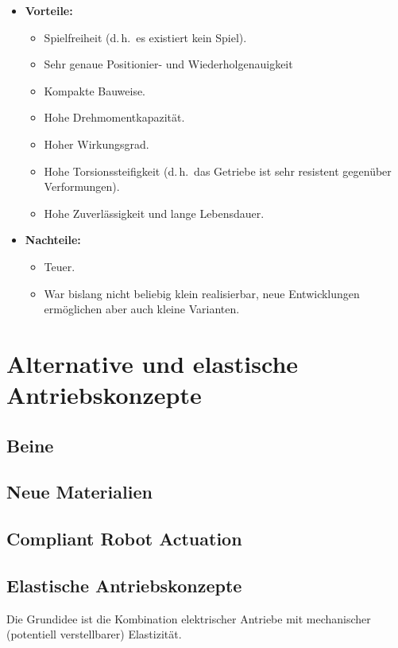 \documentclass[a4paper, 11pt, accentcolor = tud3b]{tudreport}
\renewcommand{\dh}{d.\,h.~}
\begin{document}
					\begin{itemize}
						\item \textbf{Vorteile:}
							\begin{itemize}
								\item Spielfreiheit (\dh es existiert kein Spiel).
								\item Sehr genaue Positionier- und Wiederholgenauigkeit
								\item Kompakte Bauweise.
								\item Hohe Drehmomentkapazität.
								\item Hoher Wirkungsgrad.
								\item Hohe Torsionssteifigkeit (\dh das Getriebe ist sehr resistent gegenüber Verformungen).
								\item Hohe Zuverlässigkeit und lange Lebensdauer.
							\end{itemize}
						\item \textbf{Nachteile:}
							\begin{itemize}
								\item Teuer.
								\item War bislang nicht beliebig klein realisierbar, neue Entwicklungen ermöglichen aber auch kleine Varianten.
							\end{itemize}
					\end{itemize}

		\section{Alternative und elastische Antriebskonzepte} %

			\subsection{Beine} %

			\subsection{Neue Materialien} %

			\subsection{Compliant Robot Actuation} %

			\subsection{Elastische Antriebskonzepte} %
				Die Grundidee ist die Kombination elektrischer Antriebe mit mechanischer (potentiell verstellbarer) Elastizität.
				
\end{document}
